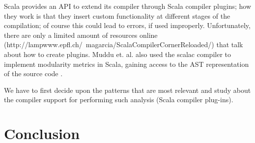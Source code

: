 \documentclass{article}
\begin{document}
Scala provides an API to extend its compiler through Scala compiler plugins; how they work is that they insert custom functionality at different stages of the compilation; of course this could lead to errors, if used improperly. Unfortunately, there are only a limited amount of resources online (http://lampwww.epfl.ch/~magarcia/ScalaCompilerCornerReloaded/) that talk about how to create plugins. Muddu et. al. also used the scalac compiler to implement modularity metrics in Scala, gaining access to the AST representation of the source code \cite{DBLP:conf/icse/MudduABP13}.\par
We have to first decide upon the patterns that are most relevant and study about the compiler support for performing such analysis (Scala compiler plug-ins). 

\section{Conclusion}


\newpage


 

\end{document}
